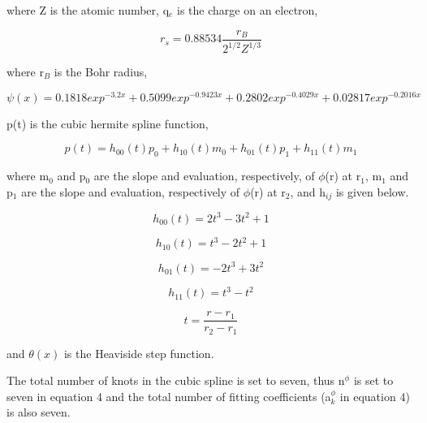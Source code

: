 \documentclass[review]{elsarticle}
\begin{document}
where Z is the atomic number, q$_{e}$ is the charge on an electron, 

\begin{equation}
r_{s} = 0.88534\frac{r_{B}}{2^{1/2}Z^{1/3}}
\end{equation}

where r$_{B}$ is the Bohr radius,

\begin{equation}
\psi(x) = 0.1818exp^{-3.2x} + 0.5099exp^{-0.9423x} + 0.2802exp^{-0.4029x} + 0.02817exp^{-0.2016x}
\end{equation}

p(t) is the cubic hermite spline function,

\begin{equation}
	p(t) = h_{00}(t)p_{0} + h_{10}(t)m_{0} + h_{01}(t)p_{1} + h_{11}(t)m_{1}
\end{equation}

where m$_{0}$ and p$_{0}$ are the slope and evaluation, respectively, of $\phi$(r) at r$_{1}$, m$_{1}$ and p$_{1}$ are the slope and evaluation, respectively of $\phi$(r) at r$_{2}$, and h$_{ij}$ is given below.

\begin{equation}
h_{00}(t) = 2t^{3} - 3t^{2} + 1
\end{equation}

\begin{equation}
h_{10}(t) = t^{3} - 2t^{2} + 1
\end{equation}

\begin{equation}
h_{01}(t) = -2t^{3} + 3t^{2} 
\end{equation}

\begin{equation}
h_{11}(t) = t^{3} - t^{2}
\end{equation}

\begin{equation}
t = \frac{r - r_{1}}{r_{2} - r_{1}}
\end{equation}

and $\theta(x)$ is the Heaviside step function.

The total number of knots in the cubic spline is set to seven, thus n$^{\phi}$ is set to seven in equation 4 and the total number of fitting coefficients (a$_{k}^{\phi}$ in equation 4) is also seven.
\end{document}
